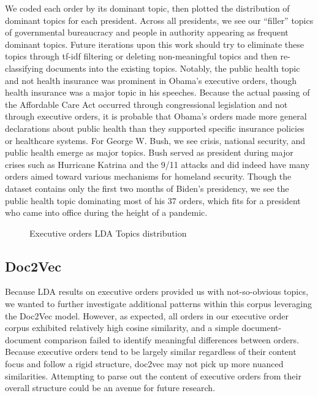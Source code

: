 \documentclass{article}
\begin{document}
{{We coded each order by its dominant topic, then plotted the distribution of dominant topics for each president. Across all presidents, we see our “filler” topics of governmental bureaucracy and people in authority appearing as frequent dominant topics. Future iterations upon this work should try to eliminate these topics through tf-idf filtering or deleting non-meaningful topics and then re-classifying documents into the existing topics. 
Notably, the public health topic and not health insurance was prominent in Obama’s executive orders, though health insurance was a major topic in his speeches. Because the actual passing of the Affordable Care Act occurred through congressional legislation and not through executive orders, it is probable that Obama’s orders made more general declarations about public health than they supported specific insurance policies or healthcare systems. For George W. Bush, we see crisis, national security, and public health emerge as major topics. Bush served as president during major crises such as Hurricane Katrina and the 9/11 attacks and did indeed have many orders aimed toward various mechanisms for homeland security. Though the dataset contains only the first two months of Biden’s presidency, we see the public health topic dominating most of his 37 orders, which fits for a president who came into office during the height of a pandemic.
}
\begin{figure}[H]
	\caption{\label{fig:my-label4} Executive orders LDA Topics distribution}
\end{figure}

\subsection{Doc2Vec}{Because LDA results on executive orders provided us with not-so-obvious topics, we wanted to further investigate additional patterns within this corpus leveraging the Doc2Vec model. However, as expected, all orders in our executive order corpus exhibited relatively high cosine similarity, and a simple document-document comparison failed to identify meaningful differences between orders. Because executive orders tend to be largely similar regardless of their content focus and follow a rigid structure, doc2vec may not pick up more nuanced similarities. Attempting to parse out the content of executive orders from their overall structure could be an avenue for future research. 
	
}}
\end{document}
